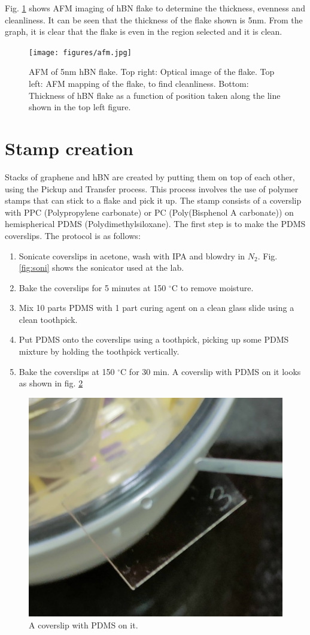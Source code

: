 Fig. \ref{fig:afm} shows AFM imaging of hBN flake to determine the thickness, evenness and cleanliness. It can be seen that the thickness of the flake shown is 5nm. From the graph, it is clear that the flake is even in the region selected and
it is clean.

\begin{figure}[H]
	\centering
	\texttt{[image: figures/afm.jpg]}
	\caption{AFM of 5nm hBN flake. Top right: Optical image of the flake. Top left: AFM mapping of the flake, to find cleanliness. Bottom: Thickness of hBN flake as a function of position taken along the line shown in the top left figure. }
	\label{fig:afm}
\end{figure}

\section{Stamp creation}

Stacks of graphene and hBN are created by putting them on top of each other, using the Pickup and Transfer process. This process involves the use of polymer stamps that can stick to a flake and pick it up. The stamp consists of a coverslip with PPC (Polypropylene carbonate) or PC (Poly(Bisphenol A carbonate)) on hemispherical PDMS (Polydimethylsiloxane). The first step is to make the PDMS coverslips. The protocol is as follows:
\begin{enumerate}
	\item Sonicate coverslips in acetone, wash with IPA and blowdry in $N_2$. Fig. \ref{fig:soni} shows the sonicator used at the lab.
	\item Bake the coverslips for 5 minutes at 150 $^{\circ}$C to remove moisture.
	\item Mix 10 parts PDMS with 1 part curing agent on a clean glass slide using a clean toothpick.
	\item Put PDMS onto the coverslips using a toothpick, picking up some PDMS mixture by holding the toothpick vertically.
	\item Bake the coverslips at 150 $^{\circ}$C for 30 min. A coverslip with PDMS on it looks as shown in fig. \ref{fig:pdms}
\end{enumerate}

\begin{figure}[H]
	\centering
	\includegraphics[width=0.4\linewidth]{figures/pdms}
	\caption{A coverslip with PDMS on it.}
	\label{fig:pdms}
\end{figure}

